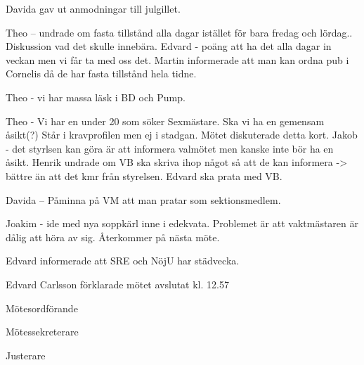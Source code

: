\documentclass[10pt]{article}
\def\mo{Edvard Carlsson}
\def\ms{Mattias Lundström}
\def\ji{Lina Samnegård}
\begin{document}
\begin{paragrafer}
Davida gav ut anmodningar till julgillet.

Theo -- undrade om fasta tillstånd alla dagar istället för bara fredag och lördag.. Diskussion vad det skulle innebära. 
Edvard - poäng att ha det alla dagar in veckan men vi får ta med oss det. Martin informerade att man kan ordna pub i  Cornelis då de har fasta tillstånd hela tidne. 


Theo - vi har massa läsk i BD och Pump. 

Theo - Vi har en under 20 som söker Sexmästare. Ska vi ha en gemensam åsikt(?) Står i kravprofilen men ej i stadgan. Mötet diskuterade detta kort. 
Jakob - det styrlsen kan göra är att informera valmötet men kanske inte bör ha en åsikt. Henrik undrade om VB ska skriva ihop något så att de kan informera -> bättre än att det kmr från styrelsen. Edvard ska prata med VB. 

Davida -- Påminna på VM att man pratar som sektionsmedlem. 

Joakim - ide med nya soppkärl inne i edekvata. Problemet är att vaktmästaren är dålig att höra av sig. Återkommer på nästa möte. 

Edvard informerade att SRE och NöjU har städvecka. 



{\mo} förklarade mötet avslutat kl. 12.57
\end{paragrafer}

\hidesignfoot
\begin{signatures}{3}
\signature{\mo}{Mötesordförande}
\signature{\ms}{Mötessekreterare}
\signature{\ji}{Justerare}
\end{signatures}
\end{document}
